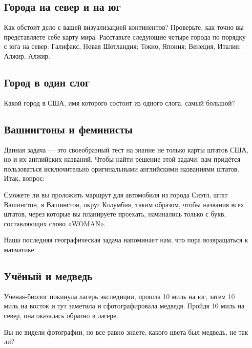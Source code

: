 \subsection*{Города на север и на юг}%


Как обстоит дело с вашей визуализацией континентов?
Проверьте, как точно вы представляете себе %
карту мира.
Расставьте следующие  четыре города по порядку с юга на север: 
Галифакс, Новая Шотландия; %
Токио, Япония; %
Венеция, Италия; %
Алжир, Алжир. %


\subsection*{Город в один слог}%


Какой город в США, имя которого состоит из одного слога,  самый большой?


\subsection*{Вашингтоны и феминисты}%


Данная задача --- это своеобразный тест на знание не только карты штатов США, но и их английских названий.  
Чтобы найти решение этой задачи, вам придётся пользоваться исключительно оригинальными английскими названиями штатов.  
Итак, вопрос:


Сможете ли вы проложить маршрут для автомобиля из города Сиэтл, штат Вашингтон, 
 в Вашингтон, округ Колумбия, таким образом, чтобы названия всех штатов, через которые вы планируете проехать, начинались только с букв, составляющих слово  «WOMAN».

Наша последняя географическая задача  напоминает нам, что пора возвращаться к матматике.  %






\subsection*{Учёный и медведь}%


Ученая-биолог покинула лагерь экспедиции, прошла 10 миль на юг, затем 10 миль на восток и тут заметила и сфотографировала медведя.  Пройдя 10 миль на север, она оказалась обратно в лагере. 

Вы не видели фотографии, но все равно знаете, какого цвета был медведь, не так ли?